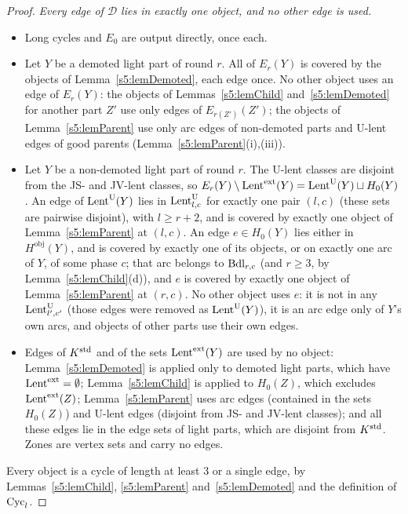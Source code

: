 \begin{proof}
\emph{Every edge of $\mathcal D$ lies in exactly one object, and no other edge is used.}
\begin{itemize}
\item Long cycles and $E_0$ are output directly, once each.
\item Let $Y$ be a demoted light part of round $r$. All of $E_r(Y)$ is covered by the objects of Lemma~\ref{s5:lemDemoted}, each edge once. No other object uses an edge of $E_r(Y)$: the objects of Lemmas~\ref{s5:lemChild} and~\ref{s5:lemDemoted} for another part $Z'$ use only edges of $E_{r(Z')}(Z')$; the objects of Lemma~\ref{s5:lemParent} use only arc edges of non-demoted parts and U-lent edges of good parents (Lemma~\ref{s5:lemParent}(i),(iii)).
\item Let $Y$ be a non-demoted light part of round $r$. The U-lent classes are disjoint from the JS- and JV-lent classes, so $E_r(Y)\setminus\mathrm{Lent}^{\mathrm{ext}}(Y)=\mathrm{Lent}^{\mathrm{U}}(Y)\sqcup H_0(Y)$. An edge of $\mathrm{Lent}^{\mathrm{U}}(Y)$ lies in $\mathrm{Lent}^{\mathrm{U}}_{l,c}$ for exactly one pair $(l,c)$ (these sets are pairwise disjoint), with $l\ge r+2$, and is covered by exactly one object of Lemma~\ref{s5:lemParent} at $(l,c)$. An edge $e\in H_0(Y)$ lies either in $H^{\mathrm{obj}}(Y)$, and is covered by exactly one of its objects, or on exactly one arc of $Y$, of some phase $c$; that arc belongs to $\mathrm{Bdl}_{r,c}$ (and $r\ge3$, by Lemma~\ref{s5:lemChild}(d)), and $e$ is covered by exactly one object of Lemma~\ref{s5:lemParent} at $(r,c)$. No other object uses $e$: it is not in any $\mathrm{Lent}^{\mathrm{U}}_{l',c'}$ (those edges were removed as $\mathrm{Lent}^{\mathrm{U}}(Y)$), it is an arc edge only of $Y$'s own arcs, and objects of other parts use their own edges.
\item Edges of $K^{\mathrm{std}}$ and of the sets $\mathrm{Lent}^{\mathrm{ext}}(Y)$ are used by no object: Lemma~\ref{s5:lemDemoted} is applied only to demoted light parts, which have $\mathrm{Lent}^{\mathrm{ext}}=\emptyset$; Lemma~\ref{s5:lemChild} is applied to $H_0(Z)$, which excludes $\mathrm{Lent}^{\mathrm{ext}}(Z)$; Lemma~\ref{s5:lemParent} uses arc edges (contained in the sets $H_0(Z)$) and U-lent edges (disjoint from JS- and JV-lent classes); and all these edges lie in the edge sets of light parts, which are disjoint from $K^{\mathrm{std}}$. Zones are vertex sets and carry no edges.
\end{itemize}
Every object is a cycle of length at least $3$ or a single edge, by Lemmas~\ref{s5:lemChild}, \ref{s5:lemParent} and~\ref{s5:lemDemoted} and the definition of $\mathrm{Cyc}_l$.


\end{proof}
